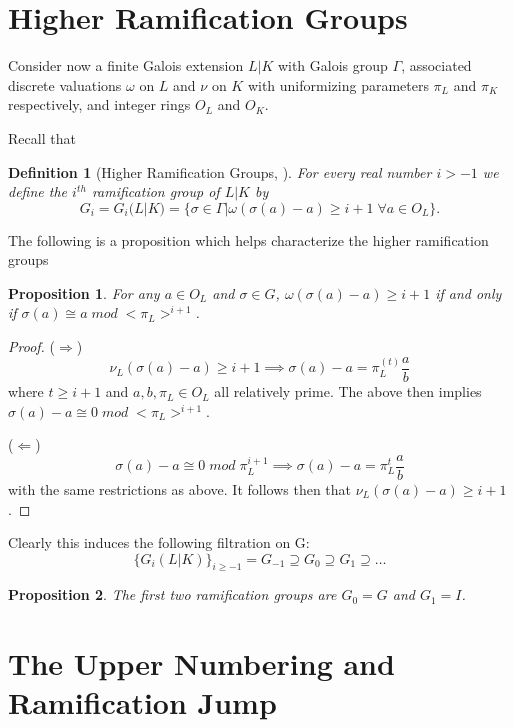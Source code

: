 \documentclass[paper=a4, fontsize=11pt]{scrartcl} %
\numberwithin{equation}{section} %
\numberwithin{figure}{section} %
\numberwithin{table}{section} %
\theoremstyle{break}
\newtheorem{defn}{Definition}
\newtheorem{prop}{Proposition}
\begin{document}
\section{Higher Ramification Groups}
Consider now a finite Galois extension $L|K$ with Galois group $\Gamma$, associated discrete valuations $\omega$ on $L$ and $\nu$ on $K$ with uniformizing parameters $\pi_L$ and $\pi_K$ respectively, and integer rings $O_L$ and $O_K$.

Recall that 
\begin{defn}[Higher Ramification Groups, \cite{Serre}]
For every real number $i > -1$ we define the $i^{th}$ ramification group of $L|K$ by
$$
G_i = G_i(L|K) = \{\sigma \in \Gamma | \omega(\sigma(a)-a)\geq i+1 \;\forall a \in O_L\}.
$$
\end{defn}
The following is a proposition which helps characterize the higher ramification groups
\begin{prop}
For any $a \in O_L$ and $\sigma \in G$, $\omega(\sigma(a) - a) \geq i+1$ if and only if  $\sigma(a) \cong a \; mod \; <\pi_L>^{i+1}$.
\end{prop}
\begin{proof}

($\Rightarrow$)
$$
\nu_L(\sigma(a)-a) \geq i+1 \implies \sigma(a)-a = \pi_L^(t)\frac{a}{b}
$$
where $t \geq i+1$ and $a,b,\pi_L\in O_L$ all relatively prime. The above then implies $\sigma(a)-a \cong 0 \; mod \; <\pi_L>^{i+1}$.

($\Leftarrow$) $$\sigma(a)-a \cong 0 \; mod \; \pi_L^{i+1} \implies \sigma(a)-a = \pi_L^{t}\frac{a}{b}$$
with the same restrictions as above. It follows then that $\nu_L(\sigma(a)-a) \geq i+1$.
\end{proof}
Clearly this induces the following filtration on G:
$$
\{G_i(L|K)\}_{i\geq -1} = G_{-1} \supseteq G_0 \supseteq G_1 \supseteq \ldots
$$


\begin{prop}
The first two ramification groups are $G_{0} = G$ and $G_{1}=I$.
\end{prop}

\section{The Upper Numbering and Ramification Jump}
\end{document}
